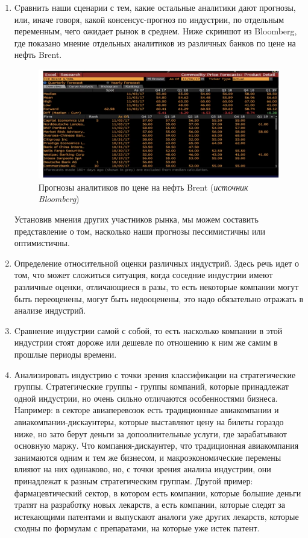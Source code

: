 \documentclass{article}
\begin{document}
\begin{enumerate}
	\item Cравнить наши сценарии с тем, какие остальные аналитики дают прогнозы, или, иначе говоря, какой консенсус-прогноз по индустрии, по отдельным переменным, чего ожидает рынок в среднем.
	Ниже скриншот из Bloomberg, где показано мнение отдельных аналитиков из различных банков по цене на нефть Brent. 
	\begin{figure}[h]
		\centering
		\includegraphics[scale = 0.25]{brent.jpg}
		\caption{Прогнозы аналитиков по цене на нефть Brent (\textit{источник Bloomberg})}
		\label{model}
	\end{figure}
	
	Установив мнения других участников рынка, мы можем составить представление о том, насколько наши прогнозы пессимистичны или оптимистичны. 
	
	\item Определение относительной оценки различных индустрий. Здесь речь идет о том, что может сложиться ситуация, когда соседние индустрии имеют различные оценки, отличающиеся в разы, то есть некоторые компании могут быть переоценены, могут быть недооценены, это надо обязательно отражать в анализе индустрий.
	
	\item Cравнение индустрии самой с собой, то есть насколько компании в этой индустрии стоят дороже или дешевле по отношению к ним же самим в прошлые периоды времени.
	
	\item Анализировать индустрию с точки зрения классификации на стратегические группы. Стратегические группы  - группы компаний, которые принадлежат одной индустрии, но очень сильно отличаются особенностями бизнеса. Например: в секторе авиаперевозок есть традиционные авиакомпании и авиакомпании-дискаунтеры, которые выставляют цену на билеты гораздо ниже, но зато берут деньги за допоолнительные услуги, где зарабатывают основную маржу. Что компания-дискаунтер, что традиционная авиакомпания занимаются одним и тем же бизнесом, и макроэкономические перемены влияют на них одинаково, но, с точки зрения анализа индустрии, они принадлежат к разным стратегическим группам.  Другой пример: фармацевтический сектор, в котором есть компании, которые большие деньги тратят на разработку новых лекарств, а есть компании, которые следят за истекающими патентами и выпускают аналоги уже других лекарств, которые сходны по формулам с препаратами, на которые уже истек патент.
	

\end{enumerate}
\end{document}
